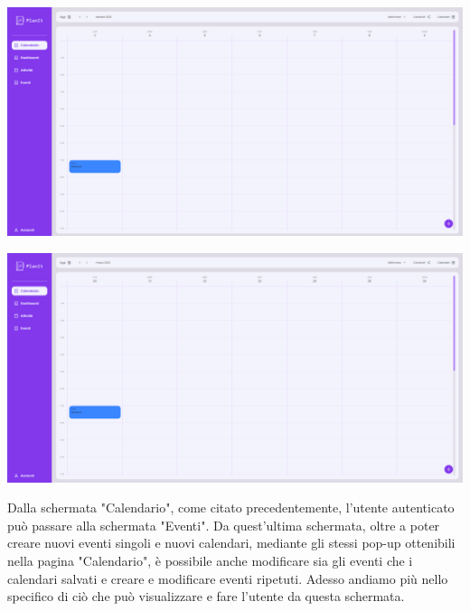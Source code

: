 \begin{center}
    \includegraphics[width=1\textwidth, height=0.3\textheight]{img/png/FrontEnd/Calendario/calendario_passato.png}
\end{center}

\begin{center}
    \includegraphics[width=1\textwidth, height=0.3\textheight]{img/png/FrontEnd/Calendario/calendario_futuro.png}
\end{center}

Dalla schermata "Calendario", come citato precedentemente, l'utente autenticato può passare alla schermata "Eventi". Da quest'ultima schermata, oltre a poter creare nuovi eventi singoli e nuovi calendari, mediante gli stessi pop-up ottenibili nella pagina "Calendario", è possibile anche modificare sia gli eventi che i calendari salvati e creare e modificare eventi ripetuti. Adesso andiamo più nello specifico di ciò che può visualizzare e fare l'utente da questa schermata.

